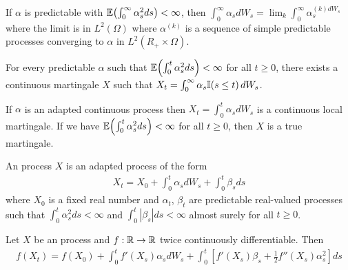 \begin{defn}
  \label{sec:brown-moti-stoch-4}
  If $\alpha$ is predictable with $\E{\int_{0}^{\infty} \alpha_{s}^{2}
    ds} < \infty$, then $\int_{0}^{\infty} \alpha_{s} dW_{s} = \lim_{k}
  \int_{0}^{\infty} \alpha_{s}^{(k) dW_{s}}$ where the limit is in
  $L^{2}(\Omega)$ where $\alpha^{(k)}$ is a sequence of simple
  predictable processes converging to $\alpha$ in $L^{2}(R_{+} \times \Omega)$.
\end{defn}

\begin{thm}
  \label{sec:brown-moti-stoch-5}
  For every predictable $\alpha$ such that $\E{\int_{0}^{t}
    \alpha_{s}^{2} ds} < \infty$ for all $t \geq 0$, there exists a
  continuous martingale $X$ such that $X_{t} = \int_{0}^{\infty}
  \alpha_{s} \I{s \leq t} dW_{s}$.
\end{thm}

\begin{thm}
  \label{sec:brown-moti-stoch-6}
  If $\alpha$ is an adapted continuous process then $X_{t} =
  \int_{0}^{t} \alpha_{s} dW_{s}$ is a continuous local martingale. If
  we have $\E{\int_{0}^{t} \alpha_{s}^{2} ds} < \infty$ for all $t
  \geq 0$, then $X$ is a true martingale.
\end{thm}


\begin{defn}
  \label{sec:brown-moti-stoch-7}
  An \ito process $X$ is an adapted process of the form
  \begin{align}
    \label{eq:16}
    X_{t} = X_{0} + \int_{0}^{t} \alpha_{s} dW_{s} + \int_{0}^{t}
    \beta_{s} ds
  \end{align} where $X_{0}$ is a fixed real number and $\alpha_{t}$,
  $\beta_{t}$ are predictable real-valued processes such that
  $\int_{0}^{t} \alpha_{s}^{2} ds < \infty$ and $\int_{0}^{t}
  |\beta_{s}| ds < \infty$ almost surely for all $t \geq 0$.
\end{defn}

\begin{thm}
  \label{sec:brown-moti-stoch-8}
  Let $X$ be an \ito process and $f: \mathbb{R} \rightarrow \mathbb{R}$ twice
  continuously differentiable.  Then
  \begin{align}
    \label{eq:17}
    f(X_{t}) = f(X_{0}) + \int_{0}^{t} f'(X_{s}) \alpha_{s} dW_{s} +
    \int_{0}^{t} [f'(X_{s}) \beta_{s} + \frac{1}{2} f''(X_{s})
    \alpha_{s}^{2}] ds
  \end{align}
\end{thm}

